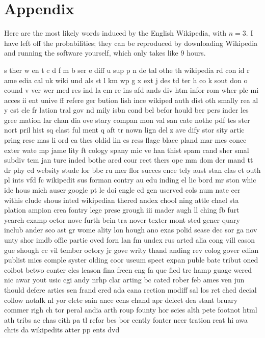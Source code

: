 \documentclass[twocolumn]{article}
\begin{document}
\section*{Appendix}

Here are the most likely words induced by the English Wikipedia, with $n=3$.
I have left off the probabilities; they can be reproduced by downloading
Wikipedia and running the software yourself, which only takes like 9 hours.

s
ther
w
en
t
c
d
f
m
b
ser
e
diff
u
sup
p
n
de
tal
othe
th
wikipedia
rd
con
id
r
ame
edia
cal
uk
wiki
und
als
st
l
km
wp
g
x
ext
j
des
td
ter
h
co
k
sout
don
o
cound
v
ver
wer
med
res
ind
la
em
re
ins
afd
ands
div
htm
infor
rom
wher
ple
mi
acces
ii
ent
unive
ff
refere
ger
bution
lish
ince
wikiped
auth
dist
oth
smally
rea
al
y
est
cle
fr
lation
tral
gov
nd
mily
isbn
cond
bel
befor
hould
ber
pers
inder
les
gree
mation
lar
chan
dia
ove
stary
compan
mon
val
san
cate
nothe
pdf
tes
ster
nort
pril
hist
sq
clast
ful
ment
q
aft
tr
nown
lign
del
z
ave
dify
stor
sity
artic
pring
rese
mas
li
ord
ca
thes
oldid
lin
es
ress
flage
blace
pland
mar
mes
conce
exter
wate
mp
jame
lity
ft
cology
spany
mic
ve
han
thist
spam
cand
sher
smal
subdiv
tem
jan
ture
inded
bothe
ared
cour
rect
thers
ope
mm
dom
der
mand
tt
dr
phy
cd
websity
stude
lor
bbc
ru
mer
flor
succes
ence
tely
aust
stan
clas
et
outh
pl
ints
vfd
fc
wikipedit
sus
forman
contry
au
edu
inding
el
lic
bord
mr
ston
whic
ide
hous
mich
auser
google
pt
le
doi
engle
ed
gen
userved
cols
num
nate
cer
withis
clude
shous
inted
wikipedian
thered
andex
chool
ning
attle
chael
sta
plation
ampion
crea
fontry
lege
prese
grough
iii
mader
augh
ll
ching
fb
furt
yearch
examp
octor
nove
furth
bein
tra
nover
texter
mont
sted
gener
quary
inclub
ander
sco
ast
gr
wome
ality
lon
hough
ano
exas
polid
sease
dec
sor
ga
nov
unty
shor
imdb
offic
partic
oved
forn
lan
fm
undex
rus
arted
alia
cong
vill
eason
gue
shough
cc
vil
tember
octory
jr
gove
writy
thand
anding
rev
colog
gover
edian
publist
mics
comple
syster
olding
coor
useum
spect
expan
puble
bate
tribut
oned
coibot
betwo
conter
cles
leason
fina
freen
eng
fa
que
fied
tre
hamp
guage
wered
nic
awar
yout
usic
cgi
andy
nrhp
clar
arting
bc
cated
rober
feb
ames
ven
jun
thould
defere
artics
sen
frand
cred
ada
cana
rection
modiff
sal
los
ret
ched
decial
collow
notalk
nl
yor
elete
sain
ance
cens
chand
apr
delect
dea
stant
bruary
commer
righ
ch
tor
peral
andia
arth
roup
founty
hor
scies
alth
pete
footnot
html
ath
tribs
ac
chas
eith
pa
tl
refor
bes
bor
cently
fonter
neer
tration
reat
hi
awa
chris
da
wikipedits
atter
pp
ents
dvd
\end{document}
